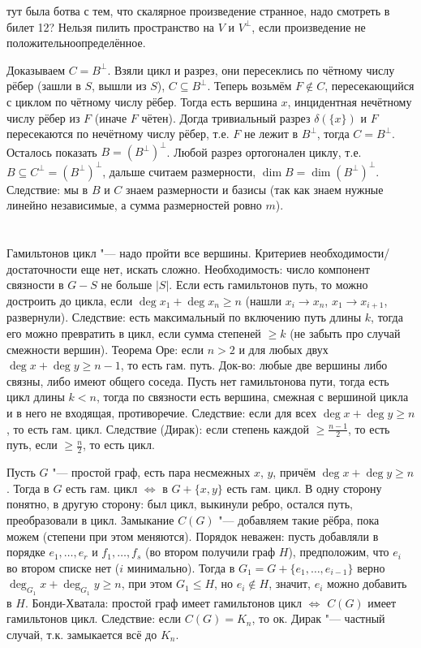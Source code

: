 \TODO тут была ботва с тем, что скалярное произведение странное, надо смотреть в билет 12?
Нельзя пилить пространство на $V$ и $V^\bot$, если произведение не положительноопределённое.

Доказываем $C=B^\bot$.
Взяли цикл и разрез, они пересеклись по чётному числу рёбер (зашли в $S$, вышли из $S$),
$C\subseteq B^\bot$.
Теперь возьмём $F\notin C$, пересекающийся с циклом по чётному числу рёбер.
Тогда есть вершина $x$, инцидентная нечётному числу рёбер из $F$ (иначе $F$ чётен).
Догда тривиальный разрез $\delta(\{x\})$ и $F$ пересекаются по нечётному числу рёбер,
т.е. $F$ не лежит в $B^\bot$, тогда $C=B^\bot$.
Осталось показать $B=(B^\bot)^\bot$.
Любой разрез ортогонален циклу, т.е. $B\subseteq C^\bot = (B^\bot)^\bot$,
дальше считаем размерности, $\dim B = \dim (B^\bot)^\bot$.
Следствие: мы в $B$ и $C$ знаем размерности и базисы (так как знаем нужные линейно независимые,
а сумма размерностей ровно $m$).

\section{} %
Гамильтонов цикл "--- надо пройти все вершины.
Критериев необходимости/достаточности еще нет, искать сложно.
Необходимость: число компонент связности в $G-S$ не больше $|S|$.
Если есть гамильтонов путь, то можно достроить до цикла, если $\deg x_1 + \deg x_n \ge n$
(нашли $x_i \to x_n$, $x_1 \to x_{i+1}$, развернули).
Следствие: есть максимальный по включению путь длины $k$, тогда его можно превратить в цикл,
если сумма степеней $\ge k$ (не забыть про случай смежности вершин).
Теорема Оре: если $n>2$ и для любых двух $\deg x + \deg y \ge n - 1$, то есть гам. путь.
Док-во: любые две вершины либо связны, либо имеют общего соседа.
Пусть нет гамильтонова пути, тогда есть цикл длины $k<n$, тогда по связности
есть вершина, смежная с вершиной цикла и в него не входящая, противоречие.
Следствие: если для всех $\deg x + \deg y \ge n$, то есть гам. цикл.
Следствие (Дирак): если степень каждой $\ge \frac{n-1}{2}$, то есть путь, если
$\ge \frac{n}{2}$, то есть цикл.

Пусть $G$ "--- простой граф, есть пара несмежных $x$, $y$, причём
$\deg x + \deg y \ge n$.
Тогда в $G$ есть гам. цикл $\iff$ в $G+\{x, y\}$ есть гам. цикл.
В одну сторону понятно, в другую сторону: был цикл, выкинули ребро,
остался путь, преобразовали в цикл.
Замыкание $C(G)$ "--- добавляем такие рёбра, пока можем (степени при этом меняются).
Порядок неважен: пусть добавляли в порядке $e_1, \dots, e_r$ и $f_1, \dots, f_s$ (во втором получили граф $H$),
предположим, что $e_i$ во втором списке нет ($i$ минимально).
Тогда в $G_1=G+\{e_1, \dots, e_{i-1}\}$ верно $\deg_{G_1} x + \deg_{G_1} y \ge n$,
при этом $G_1 \le H$, но $e_i \notin H$, значит, $e_i$ можно добавить в $H$.
Бонди-Хватала: простой граф имеет гамильтонов цикл $\iff$ $C(G)$ имеет гамильтонов цикл.
Следствие: если $C(G)=K_n$, то ок.
Дирак "--- частный случай, т.к. замыкается всё до $K_n$.

